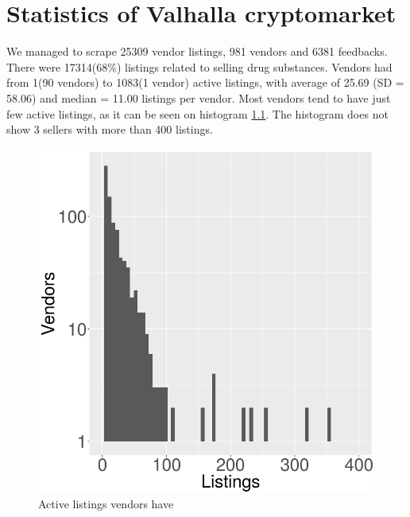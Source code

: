 \documentclass[
  digital, %
  table,   %
  lof,     %
  lot,     %
  oneside
]{fithesis3}
\begin{document}
\chapter{Statistics of Valhalla cryptomarket}

We managed to scrape 25309 vendor listings, 981 vendors and 6381 feedbacks.
There were 17314(68\%) listings related to selling drug substances.
Vendors had from 1(90 vendors) to 1083(1 vendor)
active listings, with average of 25.69 (SD = 58.06)
and median = 11.00 listings per vendor.
Most vendors tend to have just few active listings,
as it can be seen on histogram \ref{listingsxsellers}.
The histogram does not show 3 sellers with more than 400 listings.

\begin{figure}[!htb]
    \centering
    \includegraphics[scale=0.4]{listingsxsellers}
    \centering
    \caption{Active listings vendors have}
    \label{listingsxsellers}
\end{figure}
\end{document}

